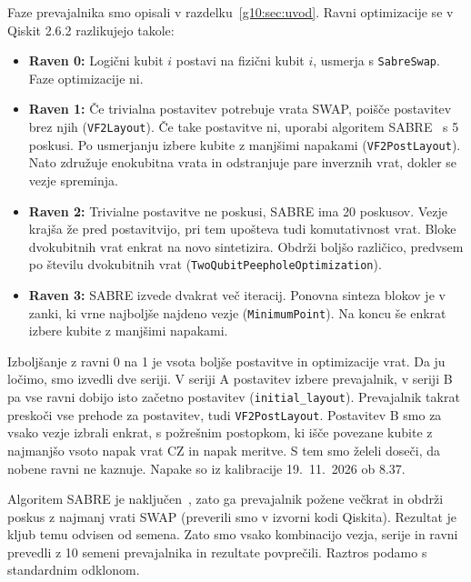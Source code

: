 \documentclass[graybox, envcountchap]{svmult}
\begin{document}
Faze prevajalnika smo opisali v razdelku~\ref{g10:sec:uvod}.
Ravni optimizacije se v Qiskit 2.6.2 razlikujejo takole:

\begin{itemize}
\item \textbf{Raven 0:}
Logični kubit $i$ postavi na fizični kubit $i$,
usmerja s \texttt{SabreSwap}.
Faze optimizacije ni.
\item \textbf{Raven 1:}
Če trivialna postavitev potrebuje vrata SWAP,
poišče postavitev brez njih (\texttt{VF2Layout}).
Če take postavitve ni, 
uporabi algoritem SABRE~\cite{g10:li2019sabre} s 5 poskusi.
Po usmerjanju izbere kubite z manjšimi napakami
(\texttt{VF2PostLayout}).
Nato združuje enokubitna vrata in odstranjuje pare inverznih vrat,
dokler se vezje spreminja.
\item \textbf{Raven 2:}
Trivialne postavitve ne poskusi, SABRE ima 20 poskusov.
Vezje krajša že pred postavitvijo,
pri tem upošteva tudi komutativnost vrat.
Bloke dvokubitnih vrat enkrat na novo sintetizira.
Obdrži boljšo različico, predvsem po številu dvokubitnih vrat
(\texttt{TwoQubit\allowbreak Peephole\allowbreak Optimization}).
\item \textbf{Raven 3:}
SABRE izvede dvakrat več iteracij.
Ponovna sinteza blokov je v zanki,
ki vrne najboljše najdeno vezje (\texttt{MinimumPoint}).
Na koncu še enkrat izbere kubite z manjšimi napakami.
\end{itemize}

Izboljšanje z ravni 0 na 1 je
vsota boljše postavitve in optimizacije vrat.
Da ju ločimo, smo izvedli dve seriji.
V seriji A postavitev izbere prevajalnik,
v seriji B pa vse ravni dobijo isto začetno postavitev
(\texttt{initial\_layout}).
Prevajalnik takrat preskoči vse prehode za postavitev,
tudi \texttt{VF2PostLayout}.
Postavitev B smo za vsako vezje izbrali enkrat,
s požrešnim postopkom, ki išče povezane kubite z najmanjšo vsoto
napak vrat CZ in napak meritve.
S tem smo želeli doseči, da nobene ravni ne kaznuje.
Napake so iz kalibracije 19.~11.~2026 ob 8.37.

Algoritem SABRE je naključen~\cite{g10:qiskit_transpiler_stages},
zato ga prevajalnik požene večkrat
in obdrži poskus z najmanj vrati SWAP
(preverili smo v izvorni kodi Qiskita).
Rezultat je kljub temu odvisen od semena.
Zato smo vsako kombinacijo vezja, serije in ravni
prevedli z 10 semeni prevajalnika
in rezultate povprečili.
Raztros podamo s standardnim odklonom.
\end{document}
